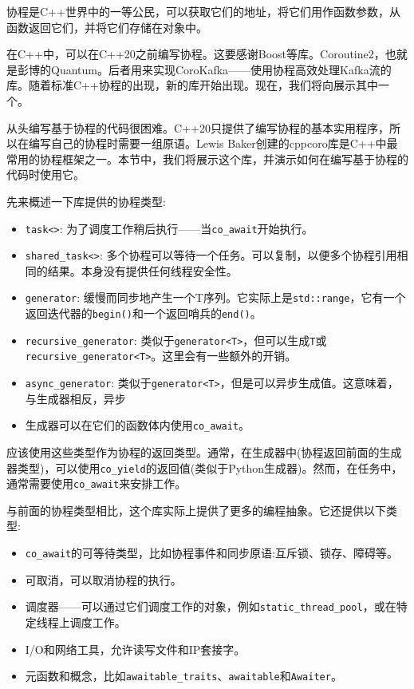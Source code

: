 协程是C++世界中的一等公民，可以获取它们的地址，将它们用作函数参数，从函数返回它们，并将它们存储在对象中。

在C++中，可以在C++20之前编写协程。这要感谢Boost等库。Coroutine2，也就是彭博的Quantum。后者用来实现CoroKafka——使用协程高效处理Kafka流的库。随着标准C++协程的出现，新的库开始出现。现在，我们将向展示其中一个。


从头编写基于协程的代码很困难。C++20只提供了编写协程的基本实用程序，所以在编写自己的协程时需要一组原语。Lewis Baker创建的cppcoro库是C++中最常用的协程框架之一。本节中，我们将展示这个库，并演示如何在编写基于协程的代码时使用它。

先来概述一下库提供的协程类型:

\begin{itemize}
\item 
\texttt{task<>}: 为了调度工作稍后执行——当\texttt{co\_await}开始执行。

\item 
\texttt{shared\_task<>}: 多个协程可以等待一个任务。可以复制，以便多个协程引用相同的结果。本身没有提供任何线程安全性。

\item 
\texttt{generator}: 缓慢而同步地产生一个T序列。它实际上是\texttt{std::range}，它有一个返回迭代器的\texttt{begin()}和一个返回哨兵的\texttt{end()}。

\item 
\texttt{recursive\_generator}: 类似于\texttt{generator<T>}，但可以生成\texttt{T}或\texttt{recursive\_generator<T>}。这里会有一些额外的开销。

\item 
\texttt{async\_generator}: 类似于\texttt{generator<T>}，但是可以异步生成值。这意味着，与生成器相反，异步

\item 
生成器可以在它们的函数体内使用\texttt{co\_await}。
\end{itemize}

应该使用这些类型作为协程的返回类型。通常，在生成器中(协程返回前面的生成器类型)，可以使用\texttt{co\_yield}的返回值(类似于Python生成器)。然而，在任务中，通常需要使用\texttt{co\_await}来安排工作。

与前面的协程类型相比，这个库实际上提供了更多的编程抽象。它还提供以下类型:

\begin{itemize}
\item 
\texttt{co\_await}的可等待类型，比如协程事件和同步原语:互斥锁、锁存、障碍等。

\item 
可取消，可以取消协程的执行。

\item 
调度器——可以通过它们调度工作的对象，例如\texttt{static\_thread\_pool}，或在特定线程上调度工作。

\item 
I/O和网络工具，允许读写文件和IP套接字。

\item 
元函数和概念，比如\texttt{awaitable\_traits}、\texttt{awaitable}和\texttt{Awaiter}。
\end{itemize}

